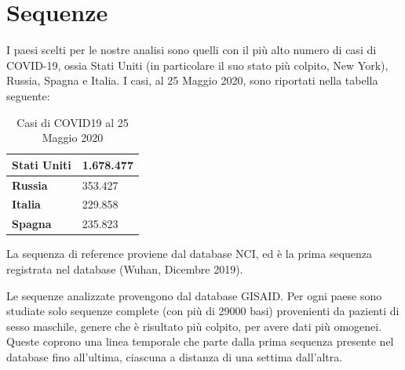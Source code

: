 \documentclass[a4paper,10pt]{article}
\begin{document}
\section{Sequenze}
I paesi scelti per le nostre analisi sono quelli con il più alto numero di casi di COVID-19, ossia Stati Uniti (in particolare il suo stato più colpito, New York), Russia, Spagna e Italia. I casi, al 25 Maggio 2020, sono riportati nella tabella seguente:

\begin{table}[H]
\centering
\begin{tabular}{|l|l|}
\hline
\textbf{Stati Uniti} & 1.678.477 \\ \hline
\textbf{Russia}      & 353.427   \\ \hline
\textbf{Italia}      & 229.858   \\ \hline
\textbf{Spagna}      & 235.823   \\ \hline
\end{tabular}
\caption{Casi di COVID19 al 25 Maggio 2020}
\end{table}
La sequenza di reference proviene dal database NCI, ed è la prima sequenza registrata nel database (Wuhan, Dicembre 2019).

\begin{table}[H]
\centering
{}
\caption{Sequenza di reference presa dal sito  \textcolor{black}{\href{https://www.ncbi.nlm.nih.gov/genbank/sars-cov-2-seqs/}{NCI}}}
\end{table}

Le sequenze analizzate provengono dal database GISAID. Per ogni paese sono studiate solo sequenze complete (con più di 29000 basi) provenienti da pazienti di sesso maschile, genere che è risultato più colpito, per avere dati più omogenei. Queste coprono una linea temporale che parte dalla prima sequenza presente nel database fino all'ultima, ciascuna a distanza di una settima dall'altra.
\end{document}
